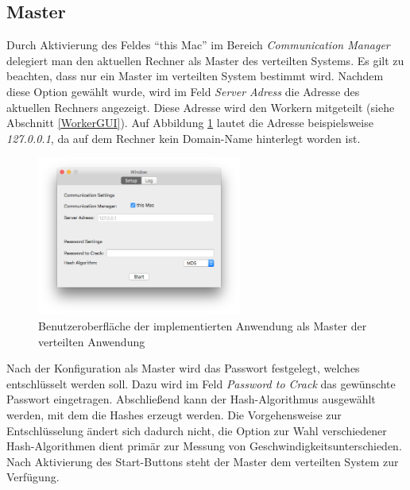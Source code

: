 \subsection{Master}
Durch Aktivierung des Feldes \enquote{this Mac} im Bereich \emph{Communication Manager} delegiert man den aktuellen Rechner als Master des verteilten Systems. Es gilt zu beachten, dass nur ein Master im verteilten System bestimmt wird. Nachdem diese Option gewählt wurde, wird im Feld \emph{Server Adress} die Adresse des aktuellen Rechners angezeigt. Diese Adresse wird den Workern mitgeteilt (siehe Abschnitt \ref{WorkerGUI}). Auf Abbildung \ref{fig:WindowMaster} lautet die Adresse beispielsweise \emph{127.0.0.1}, da auf dem Rechner kein Domain-Name hinterlegt worden ist. \\
\begin{figure}[!ht]
	\centering
		\includegraphics[natwidth=1200pt, natheight=349pt, width=0.6\textwidth]{images/WindowMaster.png}
		\caption{Benutzeroberfläche der implementierten Anwendung als Master der verteilten Anwendung}
	\label{fig:WindowMaster}
\end{figure}
Nach der Konfiguration als Master wird das Passwort festgelegt, welches entschlüsselt werden soll. Dazu wird im Feld \emph{Password to Crack} das gewünschte Passwort eingetragen. Abschließend kann der Hash-Algorithmus ausgewählt werden, mit dem die Hashes erzeugt werden. Die Vorgehensweise zur Entschlüsselung ändert sich dadurch nicht, die Option zur Wahl verschiedener Hash-Algorithmen dient primär zur Messung von Geschwindigkeitsunterschieden. \\

Nach Aktivierung des Start-Buttons steht der Master dem verteilten System zur Verfügung.   


